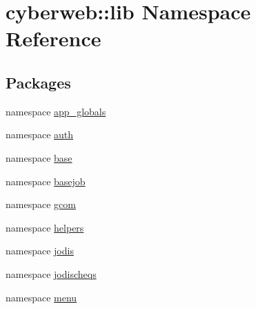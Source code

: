 \hypertarget{namespacecyberweb_1_1lib}{\section{cyberweb\-:\-:lib \-Namespace \-Reference}
\label{namespacecyberweb_1_1lib}
}
\subsection*{\-Packages}
\begin{DoxyCompactItemize}
\item 
namespace \hyperlink{namespacecyberweb_1_1lib_1_1app__globals}{app\-\_\-globals}
\item 
namespace \hyperlink{namespacecyberweb_1_1lib_1_1auth}{auth}
\item 
namespace \hyperlink{namespacecyberweb_1_1lib_1_1base}{base}
\item 
namespace \hyperlink{namespacecyberweb_1_1lib_1_1basejob}{basejob}
\item 
namespace \hyperlink{namespacecyberweb_1_1lib_1_1gcom}{gcom}
\item 
namespace \hyperlink{namespacecyberweb_1_1lib_1_1helpers}{helpers}
\item 
namespace \hyperlink{namespacecyberweb_1_1lib_1_1jodis}{jodis}
\item 
namespace \hyperlink{namespacecyberweb_1_1lib_1_1jodischeqs}{jodischeqs}
\item 
namespace \hyperlink{namespacecyberweb_1_1lib_1_1menu}{menu}
\end{DoxyCompactItemize}

